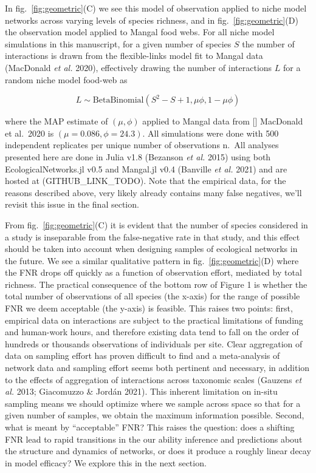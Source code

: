 \documentclass[10pt,oneside]{article}
\begin{document}
In fig.~\ref{fig:geometric}(C) we see this model of observation applied
to niche model networks across varying levels of species richness, and
in fig.~\ref{fig:geometric}(D) the observation model applied to Mangal
food webs. For all niche model simulations in this manuscript, for a
given number of species \(S\) the number of interactions is drawn from
the flexible-links model fit to Mangal data (MacDonald \emph{et al.}
2020), effectively drawing the number of interactions \(L\) for a random
niche model food-web as

\[L \sim  \text{BetaBinomial}(S^2-S+1,\mu\phi, 1-\mu\phi)\]

where the MAP estimate of \((\mu, \phi)\) applied to Mangal data from
{[}{]} MacDonald et al.~2020 is \((\mu=0.086, \phi=24.3)\). All
simulations were done with 500 independent replicates per unique number
of observations n.~All analyses presented here are done in Julia v1.8
(Bezanson \emph{et al.} 2015) using both EcologicalNetworks.jl v0.5 and
Mangal.jl v0.4 (Banville \emph{et al.} 2021) and are hosted at
(GITHUB\_LINK\_TODO). Note that the empirical data, for the reasons
described above, very likely already contains many false negatives,
we'll revisit this issue in the final section.

From fig.~\ref{fig:geometric}(C) it is evident that the number of
species considered in a study is inseparable from the false-negative
rate in that study, and this effect should be taken into account when
designing samples of ecological networks in the future. We see a similar
qualitative pattern in fig.~\ref{fig:geometric}(D) where the FNR drops
off quickly as a function of observation effort, mediated by total
richness. The practical consequence of the bottom row of Figure 1 is
whether the total number of observations of all species (the x-axis) for
the range of possible FNR we deem acceptable (the y-axis) is feasible.
This raises two points: first, empirical data on interactions are
subject to the practical limitations of funding and human-work hours,
and therefore existing data tend to fall on the order of hundreds or
thousands observations of individuals per site. Clear aggregation of
data on sampling effort has proven difficult to find and a meta-analysis
of network data and sampling effort seems both pertinent and necessary,
in addition to the effects of aggregation of interactions across
taxonomic scales (Gauzens \emph{et al.} 2013; Giacomuzzo \& Jordán
2021). This inherent limitation on in-situ sampling means we should
optimize where we sample across space so that for a given number of
samples, we obtain the maximum information possible. Second, what is
meant by ``acceptable'' FNR? This raises the question: does a shifting
FNR lead to rapid transitions in the our ability inference and
predictions about the structure and dynamics of networks, or does it
produce a roughly linear decay in model efficacy? We explore this in the
next section.
\end{document}

